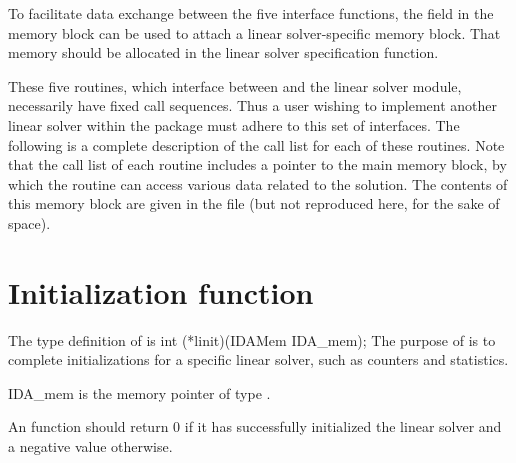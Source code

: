 To facilitate data exchange between the five interface functions, the
field  in the {\ida} memory block can be used to attach
a linear solver-specific memory block.
That memory should be allocated in the linear solver specification function.

\vspace{0.1in}
These five routines, which interface between {\ida} and the linear solver module,
necessarily have fixed call sequences.  Thus a user wishing to implement another 
linear solver within the {\ida} package must adhere to this set of interfaces.
The following is a complete description of the call list for each of
these routines.  Note that the call list of each routine includes a
pointer to the main {\ida} memory block, by which the routine can access
various data related to the {\ida} solution.  The contents of this memory
block are given in the file  (but not reproduced here, for
the sake of space).


\section{Initialization function}
The type definition of  is
{
  int (*linit)(IDAMem IDA\_mem);
}
{
  The purpose of  is to complete initializations for      
  a specific linear solver, such as counters and statistics.        
}
{
  \begin{args}
  \item[IDA\_mem]
    is the {\ida} memory pointer of type .
  \end{args}
}
{
  An  function should return $0$ if it 
  has successfully initialized the {\ida} linear solver and 
  a negative value otherwise. 
}
{}


